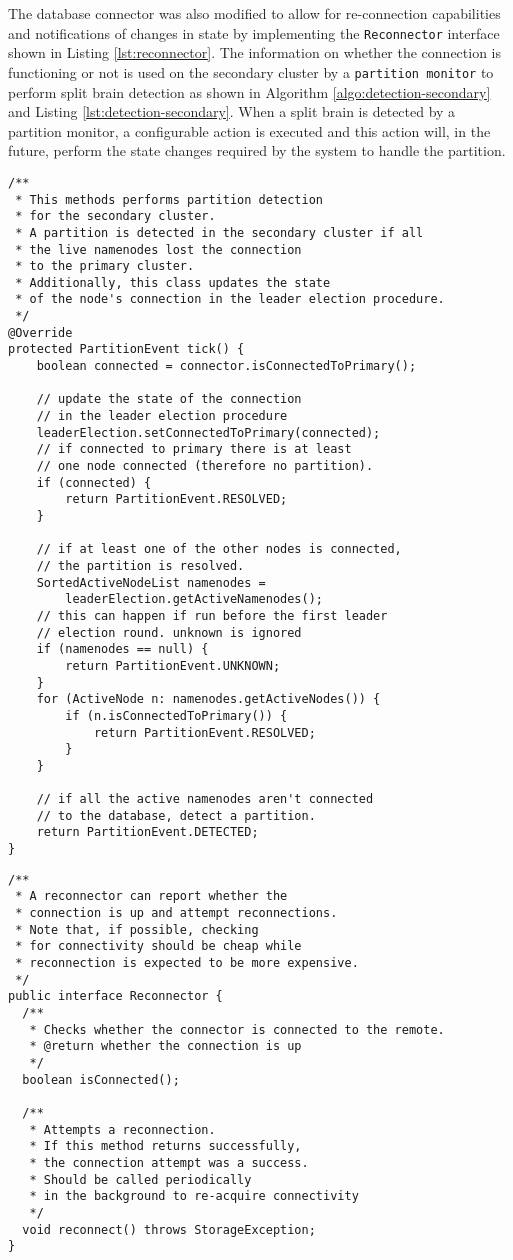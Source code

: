 The database connector was also modified to allow for re-connection capabilities and notifications of changes in state by implementing the \texttt{Reconnector} interface shown in Listing \ref{lst:reconnector}.
The information on whether the connection is functioning or not is used on the secondary cluster by a \texttt{partition monitor} to perform split brain detection as shown in Algorithm \ref{algo:detection-secondary} and Listing \ref{lst:detection-secondary}.
When a split brain is detected by a partition monitor, a configurable action is executed and this action will, in the future, perform the state changes required by the system to handle the partition.
\begin{lstlisting}[caption={Implementation of the partition detection algorithm in the secondary cluster}, label={lst:detection-secondary}]
/**
 * This methods performs partition detection
 * for the secondary cluster.
 * A partition is detected in the secondary cluster if all
 * the live namenodes lost the connection
 * to the primary cluster.
 * Additionally, this class updates the state 
 * of the node's connection in the leader election procedure.
 */
@Override
protected PartitionEvent tick() {
    boolean connected = connector.isConnectedToPrimary();

    // update the state of the connection
    // in the leader election procedure
    leaderElection.setConnectedToPrimary(connected);
    // if connected to primary there is at least
    // one node connected (therefore no partition).
    if (connected) {
        return PartitionEvent.RESOLVED;
    }

    // if at least one of the other nodes is connected,
    // the partition is resolved.
    SortedActiveNodeList namenodes = 
        leaderElection.getActiveNamenodes();
    // this can happen if run before the first leader 
    // election round. unknown is ignored
    if (namenodes == null) {
        return PartitionEvent.UNKNOWN;
    }
    for (ActiveNode n: namenodes.getActiveNodes()) {
        if (n.isConnectedToPrimary()) {
            return PartitionEvent.RESOLVED;
        }
    }

    // if all the active namenodes aren't connected
    // to the database, detect a partition.
    return PartitionEvent.DETECTED;
}
\end{lstlisting}

\begin{lstlisting}[caption={Reconnector interface}, label={lst:reconnector}]
/**
 * A reconnector can report whether the 
 * connection is up and attempt reconnections.
 * Note that, if possible, checking
 * for connectivity should be cheap while
 * reconnection is expected to be more expensive.
 */
public interface Reconnector {
  /**
   * Checks whether the connector is connected to the remote.
   * @return whether the connection is up
   */
  boolean isConnected();

  /**
   * Attempts a reconnection.
   * If this method returns successfully,
   * the connection attempt was a success.
   * Should be called periodically
   * in the background to re-acquire connectivity
   */
  void reconnect() throws StorageException;
}
\end{lstlisting}

